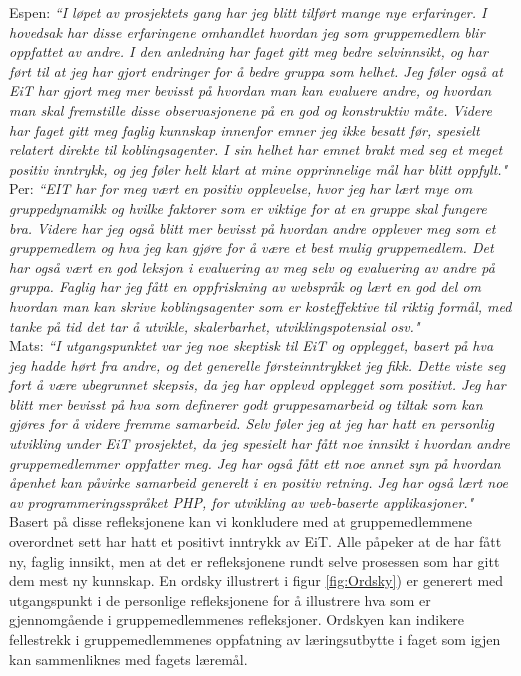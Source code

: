 Espen: \textit{``I løpet av prosjektets gang har jeg blitt tilført mange nye erfaringer. I hovedsak har disse erfaringene omhandlet hvordan jeg som gruppemedlem blir oppfattet av andre. I den anledning har faget gitt meg bedre selvinnsikt, og har ført til at jeg har gjort endringer for å bedre gruppa som helhet. Jeg føler også at EiT har gjort meg mer bevisst på hvordan man kan evaluere andre, og hvordan man skal fremstille disse observasjonene på en god og konstruktiv måte. Videre har faget gitt meg faglig kunnskap innenfor emner jeg ikke besatt før, spesielt relatert direkte til koblingsagenter. I sin helhet har emnet brakt med seg et meget positiv inntrykk, og jeg føler helt klart at mine opprinnelige mål har blitt oppfylt."}\\

Per: \textit{``EIT har for meg vært en positiv opplevelse, hvor jeg har lært mye om gruppedynamikk og hvilke faktorer som er viktige for at en gruppe skal fungere bra. Videre har jeg også blitt mer bevisst på hvordan andre opplever meg som et gruppemedlem og hva jeg kan gjøre for å være et best mulig gruppemedlem. Det har også vært en god leksjon i evaluering av meg selv og evaluering av andre på gruppa. Faglig har jeg fått en oppfriskning av webspråk og lært en god del om hvordan man kan skrive koblingsagenter som er kosteffektive til riktig formål, med tanke på tid det tar å utvikle, skalerbarhet, utviklingspotensial osv."}\\

Mats: \textit{``I utgangspunktet var jeg noe skeptisk til EiT og opplegget, basert på hva jeg hadde hørt fra andre, og det generelle førsteinntrykket jeg fikk. Dette viste seg fort å være ubegrunnet skepsis, da jeg har opplevd opplegget som positivt. Jeg har blitt mer bevisst på hva som definerer godt gruppesamarbeid og tiltak som kan gjøres for å videre fremme samarbeid.  Selv føler jeg at jeg har hatt en personlig utvikling under EiT prosjektet, da jeg spesielt har fått noe innsikt i hvordan andre gruppemedlemmer oppfatter meg. Jeg har også fått ett noe annet syn på hvordan åpenhet kan påvirke samarbeid generelt i en positiv retning. Jeg har også lært noe av programmeringsspråket PHP, for utvikling av web-baserte applikasjoner."}\\

Basert på disse refleksjonene kan vi konkludere med at gruppemedlemmene overordnet sett har hatt et positivt inntrykk av EiT. Alle påpeker at de har fått ny, faglig innsikt, men at det er refleksjonene rundt selve prosessen som har gitt dem mest ny kunnskap. En ordsky illustrert i figur \ref{fig:Ordsky}) er generert med utgangspunkt i de personlige refleksjonene for å illustrere hva som er gjennomgående i gruppemedlemmenes refleksjoner. Ordskyen kan indikere fellestrekk i gruppemedlemmenes oppfatning av læringsutbytte i faget som igjen kan sammenliknes med fagets læremål.\\

